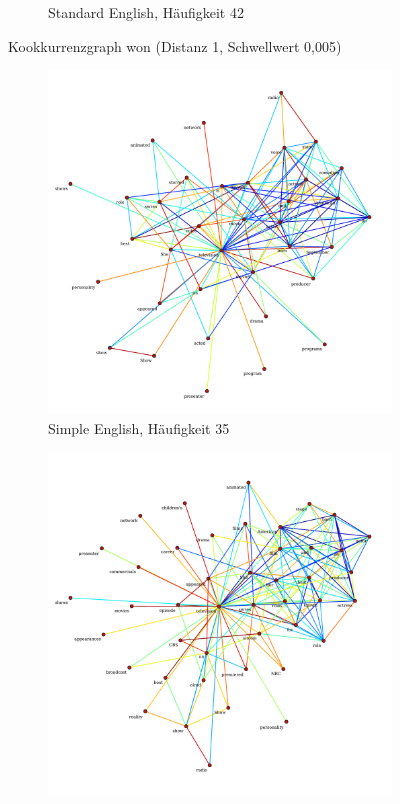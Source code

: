 \documentclass[11pt, a4paper]{article}
\begin{document}
\begin{figure}[hp!]
\begin{subfigure}[b]{0.5\textwidth}
        \caption{Standard English, Häufigkeit 42}
    \end{subfigure}
    \caption{Kookkurrenzgraph won (Distanz 1, Schwellwert 0,005)}
    \label{fig:hw-won}
\end{figure}

\begin{figure}[hp!]
    \centering
    \begin{subfigure}[b]{0.5\textwidth}
        \includegraphics[scale=.25]{../../data/results/cooc_wiki_sim/topwords-t0005/graph_television.pdf}
        \caption{Simple English, Häufigkeit 35}
    \end{subfigure}
    \begin{subfigure}[b]{0.5\textwidth}
        \includegraphics[scale=.25]{../../data/results/cooc_wiki_en/topwords-t0005/graph_television.pdf}

\end{subfigure}
\end{figure}
\end{document}
